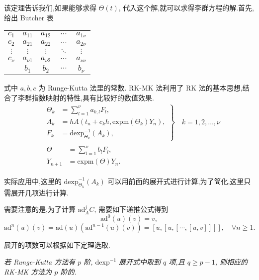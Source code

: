 该定理告诉我们,如果能够求得 $\Theta(t)$, 代入这个解,就可以求得李群方程的解.首先,给出 Butcher 表
\begin{center}
  \begin{tabular}{c|cccc}
    $c_1$&$a_{11}$&$a_{12}$&$\cdots$&$a_{1\nu}$\\
    $c_2$&$a_{21}$&$a_{22}$&$\cdots$&$a_{2\nu}$\\
    $\vdots$&$\vdots$&$\vdots$&$\ddots$&$\vdots$\\
    $c_{\nu}$&$a_{\nu 1}$&$a_{\nu 2}$&$\cdots$&$a_{\nu \nu}$\\
    \hline
         &$b_{1}$&$b_{2}$&$\cdots$&$b_{\nu}$
  \end{tabular}
\end{center}
式中 $a,b,c$ 为 Runge-Kutta 法里的常数. RK-MK 法利用了 RK 法的基本思想,结合了李群指数映射的特性,具有比较好的数值效果.
\begin{equation*}
	\begin{aligned}
		&\left.\begin{aligned}
		\Theta_k&=\sum_{l=1}^{\nu}a_{k,l}F_l,\\
		A_k&=hA(t_n+c_kh,\mbox{expm}(\Theta_k)Y_n),\\
		F_k&=\mbox{dexp}_{\Theta_k}^{-1}(A_k),
	\end{aligned}\right\rbrace \quad k=1,2,\ldots,\nu\\
		&\begin{aligned}
		\Theta&=\sum_{l=1}^{\nu}b_lF_l,\\
		Y_{n+1}&=\mbox{expm}(\Theta)Y_n.
	\end{aligned}
	\end{aligned}
\end{equation*}

实际应用中,这里的 $\mbox{dexp}_{\Theta_k}^{-1}(A_k)$ 可以用前面的展开式进行计算,为了简化,这里只需展开几项进行计算.

需要注意的是,为了计算 $\mbox{ad}^j_AC$, 需要如下递推公式得到
\begin{equation*}
	\mbox{ad}^0(u)(v)=v,
\end{equation*}
\begin{equation*}
	\mbox{ad}^n(u)(v)=\mbox{ad}(u)(\mbox{ad}^{n-1}(u)(v))=[u,[u,[\cdots,[u,v]]]],\quad \forall n \geq 1.
\end{equation*}

展开的项数可以根据如下定理选取.
\begin{theorem}
	\emph{若 Runge-Kutta 方法有 $p$ 阶, $\mbox{dexp}^{-1}$ 展开式中取到 $q$ 项,且 $q\geq p-1$, 则相应的 RK-MK 方法为 $p$ 阶的.}
\end{theorem}

